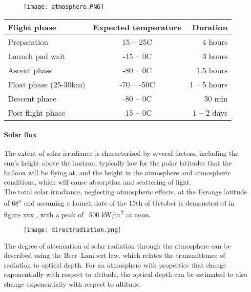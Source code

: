 	\begin{figure}[h!]
    \centering
    \texttt{[image: atmosphere.PNG]}
	\label{fig: atmosphere}
	\end{figure}
	
\begin{center}
  \begin{tabular}{ | l | c | r | }
    \hline
    \textbf{Flight phase} & \textbf{Expected temperature} & \textbf{Duration} \\ \hline
    Preparation  & 15 – 25C & 4 hours \\ \hline
    Launch pad wait & -15 – 0C & 3 hours \\ \hline
    Ascent phase  & -80 – 0C & 1.5 hours \\ \hline
    Float phase (25-30km) & -70 – -50C & 1 – 5 hours \\ \hline 
    Descent phase  & -80 – 0C & ~ 30 min \\ \hline
    Post-flight phase & -15 – 0C & 1 – 2 days \\ \hline
  \end{tabular}
\end{center}

\paragraph{Solar flux}

The extent of solar irradiance is characterised by several factors, including the sun’s height above the horizon, typically low for the polar latitudes that the balloon will be flying at, and the height in the atmosphere and atmospheric conditions, which will cause absorption and scattering of light. \\
The total solar irradiance, neglecting atmospheric effects, at the Esrange latitude of 68\textsuperscript{o} and assuming a launch date of the 15th of October is demonstrated in figure xxx , with a peak of ~500 kW/m\textsuperscript{2} at noon.\\

	\begin{figure}[h!]
    \centering
    \texttt{[image: directradiation.png]}
	\label{fig: directradiation}
	\end{figure}

The degree of attenuation of solar radiation through the atmosphere can be described using the Beer–Lambert law, which relates the transmittance of radiation to optical depth. For an atmosphere with properties that change exponentially with respect to altitude, the optical depth can be estimated to also change exponentially with respect to altitude. \


